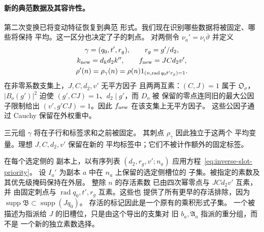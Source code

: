 \paragraph{新的典范数据及其容许性。}
第二次变换已将变动特征恢复到典范
形式。我们现在识别哪些数据将被固定、哪些将保持
平均。这一区分也决定了子的刺点。
对两侧令 \(\nu_a'=\nu_i\overline\vartheta\) 并定义
\begin{equation}\label{eq:canonical-child-data}
 \begin{gathered}
 \gamma=(q_0,t',r_g),\qquad r_g=g'/d_2,\\
 k_{\rm new}=d_kd_2k'',\qquad f_{\rm new}=JCd_2v',\\
 \rho'(n)=\rho_\gamma(n)=\rho(n)1_{(n,\operatorname{rad}q_0t'r_g)=1}.
 \end{gathered}
\end{equation}
在非零系数支集上，\(J,C,d_2,v'\) 无平方因子
且两两互素：\((C,J)=1\) 属于 \(\mathfrak O_\sigma\)，
\(|B_o(g')|^2\) 迫使 \((g',CJ)=1\)、\(d_2\mid g'\)，而 \(D_o\) 被
保留的零点连同旧的最大公因子限制给出
\((v',g'CJ)=1\)。因此 \(f_{\rm new}\) 在该支集上无平方因子。
这些公因子通过 Cauchy 保留在外权重中。

三元组 \(\gamma\) 将在子行和标签求和之前被固定。
其刺点 \(\rho_\gamma\) 因此独立于这两个
平均变量。理想 \(J,C,d_2,v'\) 保留在新的
平均标签中；它们不被计作额外的固定标签。

在每个选定侧的
副本上，以有序列表 \((d_2,r_g,v';n_a)\) 应用方程~\eqref{eq:inverse-slot-priority}。
设 \(I_a'\) 为副本 \(a\) 中在 \(n_a\) 上保留的选定侧槽位的
子集。被指定的素数及其优先级掩码保持在外层。
整除 \(n\) 的存活素数
已由四次幂零点与 \(JCd_2v'\) 互素，并
由固定刺点与 \(\operatorname{rad}q_0,t',r_g\) 互素。这些也
提供了所有更早的存活排除，因为
\(\operatorname{supp}\mathfrak B\subset\operatorname{supp}(Jq_0)\)。
存活的标记因此是一个原有的乘积形式子集。
一个被描述为指派给 \(J\) 的旧槽位，只是由这个导出的支集对
旧 \(b_a,\mathfrak A_a\) 指派的重分组，而不是
一个新的独立素数选择。

